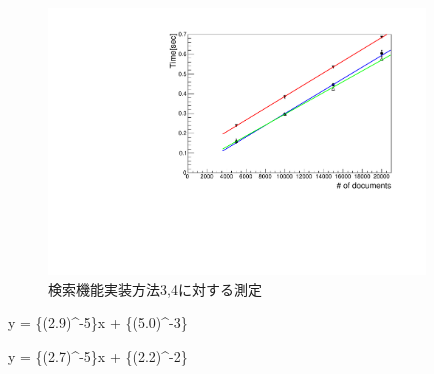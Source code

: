 \begin{figure}[bpt]
  \begin{center}
    \includegraphics[width=10cm,angle=270]{searching_time_2.pdf}
  \caption[検索機能実装方法3,4に対する測定]{検索機能実装方法3,4に対する測定}
  \label{searching_time_2}
  \end{center}
\end{figure}

\bbb
y = \{(2.9)^{-5}\}x + \{(5.0)^{-3}\}
\label{function_summary_hash}
\eee

\bbb
y = \{(2.7)^{-5}\}x + \{(2.2)^{-2}\}
\label{function_multi_thread}
\eee


